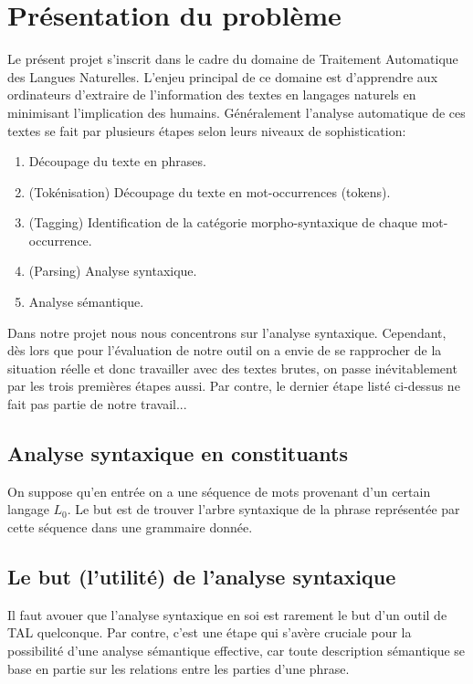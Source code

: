 \documentclass[12pt]{article}
\begin{document}
\section{Pr\'esentation du probl\`eme}

Le pr\'esent projet s'inscrit dans le cadre du domaine de Traitement Automatique
des Langues Naturelles. L'enjeu principal de ce domaine est d'apprendre aux ordinateurs d'extraire de l'information des textes en langages naturels en minimisant l'implication des humains. G\'en\'eralement l'analyse automatique de ces textes se fait par plusieurs \'etapes selon leurs niveaux de sophistication:
\begin{enumerate}
\item D\'ecoupage du texte en phrases.
\item (Tok\'enisation) D\'ecoupage du texte en mot-occurrences (tokens).
\item (Tagging) Identification de la cat\'egorie morpho-syntaxique de chaque mot-occurrence.
\item (Parsing) Analyse syntaxique.
\item Analyse s\'emantique.
\end{enumerate}

Dans notre projet nous nous concentrons sur l'analyse syntaxique. Cependant, d\`es lors que pour l'\'evaluation de notre outil on a envie de se rapprocher de la situation r\'eelle et donc travailler avec des textes brutes, on passe in\'evitablement par les trois premi\`eres \'etapes aussi. Par contre, le dernier \'etape list\'e ci-dessus ne fait pas partie de notre travail...

\subsection{Analyse syntaxique en constituants}
 On suppose qu'en entr\'ee on a une s\'equence de mots provenant d'un certain langage $L_0$. Le but est de trouver l'arbre syntaxique de la phrase repr\'esent\'ee par cette s\'equence dans une grammaire donn\'ee.

\subsection{Le but (l'utilit\'e) de l'analyse syntaxique}

Il faut avouer que l'analyse syntaxique en soi est rarement le but d'un outil de
TAL quelconque. Par contre, c'est une \'etape qui s'av\`ere cruciale pour la
possibilit\'e d'une analyse s\'emantique effective, car toute description
s\'emantique se base en partie sur les relations entre les parties d'une
phrase.
\end{document}
